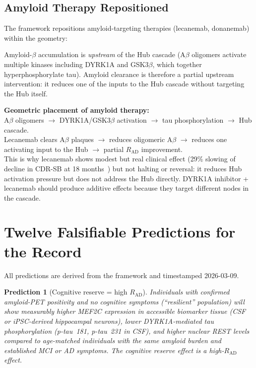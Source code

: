\documentclass[12pt,a4paper]{article}
\newenvironment{derivenv}{%
  \begin{tcolorbox}[colback=lightgray,colframe=midgray,boxrule=0.5pt,
    arc=3pt,left=8pt,right=8pt,top=6pt,bottom=6pt,breakable]}{%
  \end{tcolorbox}}
\newtheorem{prediction}{Prediction}
\newcommand{\RAD}{R_{\mathrm{AD}}}
\begin{document}
\subsection{Amyloid Therapy Repositioned}

The framework repositions amyloid-targeting therapies
(lecanemab, donanemab) within the geometry:

Amyloid-$\beta$ accumulation is \emph{upstream} of the
Hub cascade (A$\beta$ oligomers activate multiple kinases
including DYRK1A and GSK3$\beta$, which together
hyperphosphorylate tau). Amyloid clearance is therefore
a partial upstream intervention: it reduces one of the
inputs to the Hub cascade without targeting the Hub itself.

\begin{derivenv}
\textbf{Geometric placement of amyloid therapy:}\\
A$\beta$ oligomers $\to$ DYRK1A/GSK3$\beta$ activation
$\to$ tau phosphorylation $\to$ Hub cascade.\\[4pt]
Lecanemab clears A$\beta$ plaques $\to$ reduces
oligomeric A$\beta$ $\to$ reduces one activating
input to the Hub $\to$ partial $\RAD$ improvement.\\[4pt]
This is why lecanemab shows modest but real clinical
effect (29\% slowing of decline in CDR-SB at 18
months~\cite{Lecanemab2023}) but not halting or
reversal: it reduces Hub activation pressure but
does not address the Hub directly. DYRK1A inhibitor
+ lecanemab should produce additive effects because
they target different nodes in the cascade.
\end{derivenv}

\section{Twelve Falsifiable Predictions for the Record}

All predictions are derived from the framework
and timestamped 2026-03-09.

\begin{prediction}[Cognitive reserve = high $\RAD$]
\label{pred:reserve}
Individuals with confirmed amyloid-PET positivity and
no cognitive symptoms (``resilient'' population) will
show measurably higher MEF2C expression in accessible
biomarker tissue (CSF or iPSC-derived hippocampal
neurons), lower DYRK1A-mediated tau phosphorylation
(p-tau~181, p-tau~231 in CSF), and higher nuclear REST
levels compared to age-matched individuals with the
same amyloid burden and established MCI or AD symptoms.
The cognitive reserve effect is a high-$\RAD$ effect.
\end{prediction}
\end{document}
